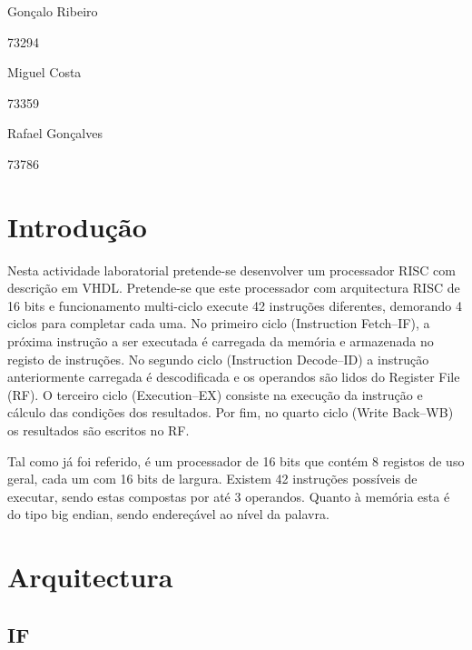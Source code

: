 \documentclass[a4paper]{article}
\begin{document}
	
	
	
	\trSetAuthors
		{
		Gonçalo Ribeiro
		
		73294
		}{
		Miguel Costa
		
		73359
		}{
		Rafael Gonçalves
		
		73786
		}
	
	
	\trMakeCover
	
	\tableofcontents
	\pagebreak
	
	\section{Introdução}
	

		Nesta actividade laboratorial pretende-se desenvolver um processador \textmu RISC com descrição em VHDL. Pretende-se que este processador com arquitectura RISC de 16 bits e funcionamento multi-ciclo execute 42 instruções diferentes, demorando 4 ciclos para completar cada uma. No primeiro ciclo (Instruction Fetch--IF), a próxima instrução a ser executada é carregada da memória e armazenada no registo de instruções. No segundo ciclo (Instruction Decode--ID) a instrução anteriormente carregada é descodificada e os operandos são lidos do Register File (RF). O terceiro ciclo (Execution--EX) consiste na execução da instrução e cálculo das condições dos resultados. Por fim, no quarto ciclo (Write Back--WB) os resultados são escritos no RF.
	
		Tal como já foi referido, é um processador de 16 bits que contém 8 registos de uso geral, cada um com 16 bits de largura. Existem 42 instruções possíveis de executar, sendo estas compostas por até 3 operandos. Quanto à memória esta é do tipo big endian, sendo endereçável ao nível da palavra.
	
	
	\section{Arquitectura}
	
		\subsection{IF}
\end{document}
